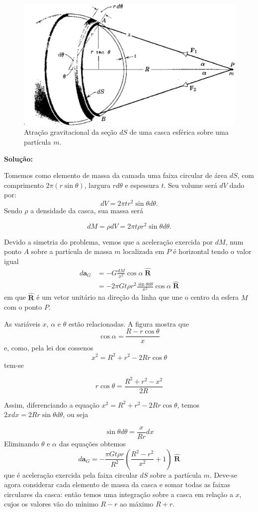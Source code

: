 \documentclass[]{book}
\theoremstyle{definition}
\theoremstyle{definition}
\theoremstyle{definition}
\theoremstyle{remark}
\begin{document}
\begin{figure}

{\centering \includegraphics[width=0.6\linewidth]{fig/Fig_02.ex1} 

}

\caption{Atração gravitacional da seção $dS$ de uma casca esférica sobre uma partícula $m$.}\label{fig:casca}
\end{figure}

\textbf{Solução:}

Tomemos como elemento de massa da camada uma faixa circular de área \(dS\), com comprimento \(2\pi(r\sin{\theta})\), largura \(rd\theta\) e espessura \(t\). Seu volume será \(dV\) dado por:
\[ dV= 2\pi t r^2\sin\theta d\theta.\]
Sendo \(\rho\) a densidade da casca, sua massa será

\[ dM= \rho dV=  2\pi t \rho r^2\sin\theta d\theta.\]

Devido a simetria do problema, vemos que a aceleração exercida por \(dM\), num ponto \(A\) sobre a partícula de massa \(m\) localizada em \(P\) é horizontal tendo o valor igual
\begin{align*}
d\mathbf{a}_G &= -G\frac{dM}{x^2}\cos\alpha\; \hat{\mathbf{R}}\\
&=-2\pi G t \rho r^2\frac{\sin\theta d\theta}{x^2}\cos\alpha\; \hat{\mathbf{R}}
\end{align*}
em que \(\hat{\mathbf{R}}\) é um vetor unitário na direção da linha que une o centro da esfera \(M\) com o ponto \(P\).

As variáveis \(x\), \(\alpha\) e \(\theta\) estão relacionadas. A figura mostra que
\[ \cos\alpha = \frac{R-r\cos\theta}{x} \]
e, como, pela lei dos cossenos
\[ x^2=R^2+r^2-2Rr\cos\theta \]
tem-se

\[ r\cos\theta = \frac{R^2+r^2-x^2}{2R}\]

Assim, diferenciando a equação \(x^2=R^2+r^2-2Rr\cos\theta\), temos \(2xdx=2Rr\sin{\theta}d\theta\), ou seja

\[\sin\theta d\theta=\frac{x}{Rr}dx\]
Eliminando \(\theta\) e \(\alpha\) das equações obtemos
\[ d\mathbf{a}_G = -\frac{\pi Gt\rho r}{R^2}\left(\frac{R^2-r^2}{x^2}+1\right)\; \hat{\mathbf{R}}\]
que é aceleração exercida pela faixa circular \(dS\) sobre a partícula \(m\). Deve-se agora considerar cada elemento de massa da casca e somar todas as faixas circulares da casca: então temos uma integração sobre a casca em relação a \(x\), cujos os valores vão do mínimo \(R-r\) ao máximo \(R+r\).
\end{document}
